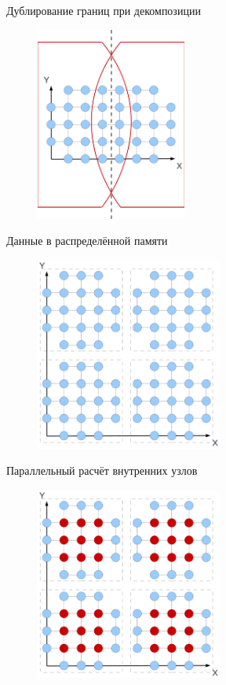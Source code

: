 \begin{frame}{Дублирование границ при декомпозиции}

\begin{figure}
\centering
\includegraphics[height=2.5in]{artwork/pdf/decomp_0}
\end{figure}

\end{frame}

\begin{frame}{Данные в распределённой памяти}

\begin{figure}
\centering
\includegraphics[height=2.5in]{artwork/pdf/decomp_1}
\end{figure}

\end{frame}

\begin{frame}{Параллельный расчёт внутренних узлов}

\begin{figure}
\centering
\includegraphics[height=2.5in]{artwork/pdf/decomp_2}
\end{figure}

\end{frame}


